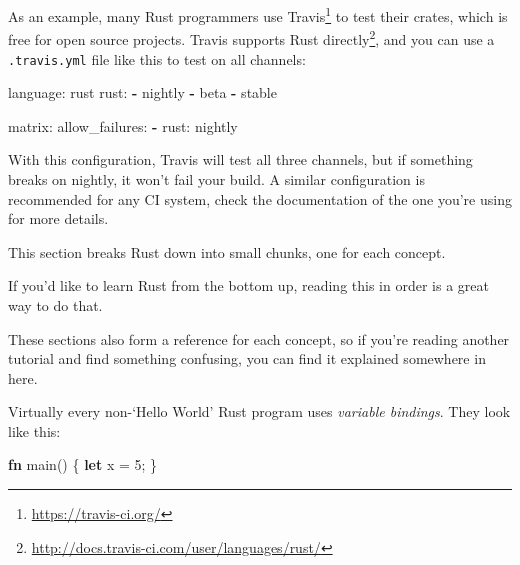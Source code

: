\documentclass[a4paper,]{book}
\newenvironment{Shaded}{\begin{snugshade}}{\end{snugshade}}
\newcommand{\KeywordTok}[1]{\textcolor[rgb]{0.13,0.29,0.53}{\textbf{{#1}}}}
\newcommand{\DecValTok}[1]{\textcolor[rgb]{0.00,0.00,0.81}{{#1}}}
\newcommand{\FunctionTok}[1]{\textcolor[rgb]{0.00,0.00,0.00}{{#1}}}
\newcommand{\NormalTok}[1]{{#1}}
\renewcommand{\href}[2]{#2\footnote{\url{#1}}}
\begin{document}
As an example, many Rust programmers use
\href{https://travis-ci.org/}{Travis} to test their crates, which is
free for open source projects. Travis
\href{http://docs.travis-ci.com/user/languages/rust/}{supports Rust
directly}, and you can use a \texttt{.travis.yml} file like this to test
on all channels:

\begin{Shaded}
\begin{Highlighting}[]
\FunctionTok{language:} \NormalTok{rust}
\FunctionTok{rust:}
  \KeywordTok{-} \NormalTok{nightly}
  \KeywordTok{-} \NormalTok{beta}
  \KeywordTok{-} \NormalTok{stable}

\FunctionTok{matrix:}
  \FunctionTok{allow_failures:}
    \KeywordTok{-} \FunctionTok{rust:} \NormalTok{nightly}
\end{Highlighting}
\end{Shaded}

With this configuration, Travis will test all three channels, but if
something breaks on nightly, it won't fail your build. A similar
configuration is recommended for any CI system, check the documentation
of the one you're using for more details.


This section breaks Rust down into small chunks, one for each concept.

If you'd like to learn Rust from the bottom up, reading this in order is
a great way to do that.

These sections also form a reference for each concept, so if you're
reading another tutorial and find something confusing, you can find it
explained somewhere in here.


Virtually every non-`Hello World' Rust program uses \emph{variable
bindings}. They look like this:

\begin{Shaded}
\begin{Highlighting}[]
\KeywordTok{fn} \NormalTok{main() \{}
    \KeywordTok{let} \NormalTok{x = }\DecValTok{5}\NormalTok{;}
\NormalTok{\}}
\end{Highlighting}
\end{Shaded}
\end{document}
